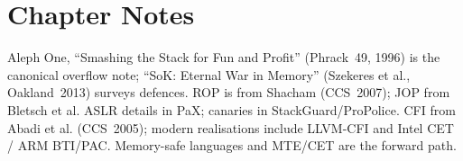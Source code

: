 \section*{Chapter Notes}
Aleph One, ``Smashing the Stack for Fun and Profit'' (Phrack~49, 1996) is the canonical overflow note; ``SoK: Eternal War in Memory'' (Szekeres et al., Oakland~2013) surveys defences. ROP is from Shacham (CCS~2007); JOP from Bletsch et al. ASLR details in PaX; canaries in StackGuard/ProPolice. CFI from Abadi et al. (CCS~2005); modern realisations include LLVM-CFI and Intel CET / ARM BTI/PAC. Memory-safe languages and MTE/CET are the forward path.

